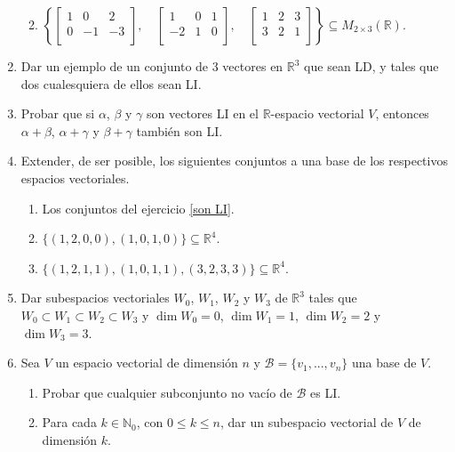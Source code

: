 \begin{enumerate}[resume, topsep=6pt, itemsep=.4cm]
\begin{enumerate}
    \vspace{0.2cm}

    \item $\left\{  \begin{bmatrix} 1 & 0 & 2 \\ 0 & -1 & -3 \\ \end{bmatrix}, \quad
    \begin{bmatrix} 1 & 0 & 1 \\ -2 & 1 & 0 \\ \end{bmatrix}, \quad
    \begin{bmatrix} 1 & 2 & 3 \\ 3 & 2 & 1 \\ \end{bmatrix} \right\}\subseteq M_{2\times 3}(\mathbb{R})$.
\end{enumerate}


\item Dar un ejemplo de un conjunto de 3 vectores en $\mathbb{R}^3$ que sean LD, y tales que dos cualesquiera de ellos sean LI.


\item  Probar que si $\alpha$, $\beta$ y $\gamma$ son vectores LI en el $\mathbb{R}$-espacio vectorial $V$, entonces $\alpha +\beta$, $\alpha +\gamma$ y $\beta +\gamma $ también son LI.


\item Extender, de ser posible, los siguientes conjuntos a una base de los respectivos espacios vectoriales.

\begin{enumerate}
    \item Los conjuntos del ejercicio \ref{son LI}.
    \item\label{10b} $\{ (1,2,0,0),(1,0,1,0) \}\subseteq\mathbb{R}^4$.
    \item\label{10c} $\{ (1,2,1,1),(1,0,1,1),(3,2,3,3)\}\subseteq\mathbb{R}^4$.
\end{enumerate}


\item Dar subespacios vectoriales $W_0$, $W_1$, $W_2$ y $W_3$ de $\mathbb{R}^3$ tales que $W_0\subset W_1\subset W_2\subset W_3$ y $\dim W_0=0$, $\dim W_1=1$, $\dim W_2=2$ y $\dim W_3=3$.


\item Sea $V$ un espacio vectorial de dimensión $n$ y $\mathcal{B}=\{v_1, ..., v_n\}$ una base de $V$.
\begin{enumerate}
 \item Probar que cualquier subconjunto no vacío de $\mathcal{B}$ es LI.
 \item Para cada $k\in\mathbb{N}_0$,  con $0\leq k\leq n$, dar un subespacio vectorial de $V$ de dimensión $k$.
\end{enumerate}



\end{enumerate}
